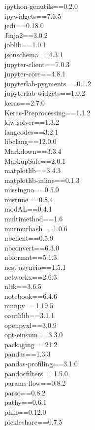 \documentclass[11pt, a4paper]{article}
\begin{document}
ipython-genutils==0.2.0\\
ipywidgets==7.6.5\\
jedi==0.18.0\\
Jinja2==3.0.2\\
joblib==1.0.1\\
jsonschema==4.3.1\\
jupyter-client==7.0.3\\
jupyter-core==4.8.1\\
jupyterlab-pygments==0.1.2\\
jupyterlab-widgets==1.0.2\\
keras==2.7.0\\
Keras-Preprocessing==1.1.2\\
kiwisolver==1.3.2\\
langcodes==3.2.1\\
libclang==12.0.0\\
Markdown==3.3.4\\
MarkupSafe==2.0.1\\
matplotlib==3.4.3\\
matplotlib-inline==0.1.3\\
missingno==0.5.0\\
mistune==0.8.4\\
modAL==0.4.1\\
multimethod==1.6\\
murmurhash==1.0.6\\
nbclient==0.5.9\\
nbconvert==6.3.0\\
nbformat==5.1.3\\
nest-asyncio==1.5.1\\
networkx==2.6.3\\
nltk==3.6.5\\
notebook==6.4.6\\
numpy==1.19.5\\
oauthlib==3.1.1\\
openpyxl==3.0.9\\
opt-einsum==3.3.0\\
packaging==21.2\\
pandas==1.3.3\\
pandas-profiling==3.1.0\\
pandocfilters==1.5.0\\
params-flow==0.8.2\\
parso==0.8.2\\
pathy==0.6.1\\
phik==0.12.0\\
pickleshare==0.7.5\\
\end{document}
